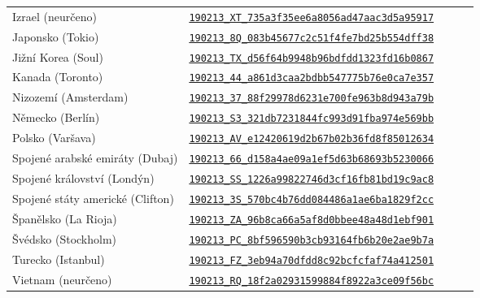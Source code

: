 \documentclass[a4paper, 12pt]{article}
\begin{document}
\begin{table}[H]
\begin{tabular}{*5l}
      Izrael (neurčeno)               & \href{https://www.webpagetest.org/result/190213_XT_735a3f35ee6a8056ad47aac3d5a95917}{\texttt{190213\_XT\_735a3f35ee6a8056ad47aac3d5a95917}} \\
      Japonsko (Tokio)                & \href{https://www.webpagetest.org/result/190213_8Q_083b45677c2c51f4fe7bd25b554dff38}{\texttt{190213\_8Q\_083b45677c2c51f4fe7bd25b554dff38}} \\
      Jižní Korea (Soul)              & \href{https://www.webpagetest.org/result/190213_TX_d56f64b9948b96bdfdd1323fd16b0867}{\texttt{190213\_TX\_d56f64b9948b96bdfdd1323fd16b0867}} \\
      Kanada (Toronto)                & \href{https://www.webpagetest.org/result/190213_44_a861d3caa2bdbb547775b76e0ca7e357}{\texttt{190213\_44\_a861d3caa2bdbb547775b76e0ca7e357}} \\
      Nizozemí (Amsterdam)            & \href{https://www.webpagetest.org/result/190213_37_88f29978d6231e700fe963b8d943a79b}{\texttt{190213\_37\_88f29978d6231e700fe963b8d943a79b}} \\
      Německo (Berlín)                & \href{https://www.webpagetest.org/result/190213_S3_321db7231844fc993d91fba974e569bb}{\texttt{190213\_S3\_321db7231844fc993d91fba974e569bb}} \\
      Polsko (Varšava)                & \href{https://www.webpagetest.org/result/190213_AV_e12420619d2b67b02b36fd8f85012634}{\texttt{190213\_AV\_e12420619d2b67b02b36fd8f85012634}} \\
      Spojené arabské emiráty (Dubaj) & \href{https://www.webpagetest.org/result/190213_66_d158a4ae09a1ef5d63b68693b5230066}{\texttt{190213\_66\_d158a4ae09a1ef5d63b68693b5230066}} \\
      Spojené království (Londýn)     & \href{https://www.webpagetest.org/result/190213_SS_1226a99822746d3cf16fb81bd19c9ac8}{\texttt{190213\_SS\_1226a99822746d3cf16fb81bd19c9ac8}} \\
      Spojené státy americké (Clifton)& \href{https://www.webpagetest.org/result/190213_3S_570bc4b76dd084486a1ae6ba1829f2cc}{\texttt{190213\_3S\_570bc4b76dd084486a1ae6ba1829f2cc}} \\
      Španělsko (La Rioja)            & \href{https://www.webpagetest.org/result/190213_ZA_96b8ca66a5af8d0bbee48a48d1ebf901}{\texttt{190213\_ZA\_96b8ca66a5af8d0bbee48a48d1ebf901}} \\
      Švédsko (Stockholm)             & \href{https://www.webpagetest.org/result/190213_PC_8bf596590b3cb93164fb6b20e2ae9b7a}{\texttt{190213\_PC\_8bf596590b3cb93164fb6b20e2ae9b7a}} \\
      Turecko (Istanbul)              & \href{https://www.webpagetest.org/result/190213_FZ_3eb94a70dfdd8c92bcfcfaf74a412501}{\texttt{190213\_FZ\_3eb94a70dfdd8c92bcfcfaf74a412501}} \\
      Vietnam (neurčeno)              & \href{https://www.webpagetest.org/result/190213_RQ_18f2a02931599884f8922a3ce09f56bc}{\texttt{190213\_RQ\_18f2a02931599884f8922a3ce09f56bc}} \\
      \bottomrule
    \end{tabular}
  \end{table}
\end{document}

